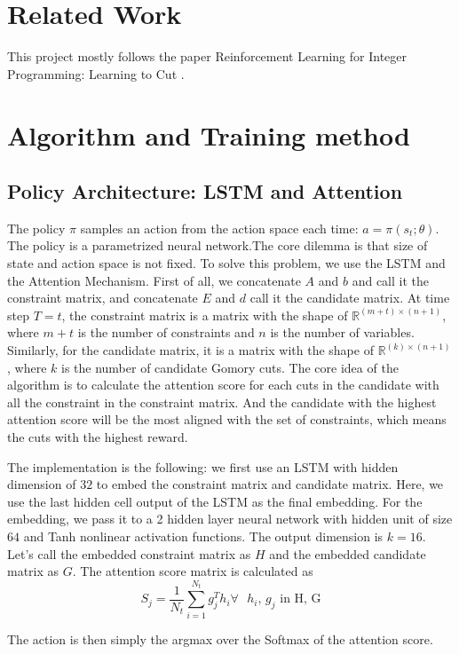 \documentclass{article}
\begin{document}
\section{Related Work}
This project mostly follows the paper Reinforcement Learning for Integer Programming: Learning to Cut \cite{rlcut}.

\section{Algorithm and Training method}
\subsection{Policy Architecture: LSTM and Attention}

The policy $\pi$ samples an action from the action space each time: $a = \pi(s_t ; \theta)$. The policy is a parametrized neural network.The core dilemma is that size of state and action space is not fixed. To solve this problem, we use the LSTM\cite{lstm} and the Attention Mechanism\cite{attention1}\cite{attention2}. First of all, we concatenate $A$ and $b$ and call it the constraint matrix, and concatenate $E$ and $d$ call it the candidate matrix. At time step $T = t$, the constraint matrix is a matrix with the shape of $\mathbb{R} ^ {(m+t) \times (n+1)}$, where $m+t$ is the number of constraints and $n$ is the number of variables. Similarly, for the candidate matrix, it is a matrix with the shape of $\mathbb{R} ^ {(k) \times (n+1)}$, where $k$ is the number of candidate Gomory cuts. The core idea of the algorithm is to calculate the attention score for each cuts in the candidate with all the constraint in the constraint matrix.\cite{rlcut} And the candidate with the highest attention score will be the most aligned with the set of constraints, which means the cuts with the highest reward. 

The implementation is the following: we first use an LSTM with hidden dimension of $32$ to embed the constraint matrix and candidate matrix. Here, we use the last hidden cell output of the LSTM as the final embedding. For the embedding, we pass it to a 2 hidden layer neural network with hidden unit of size $64$ and Tanh nonlinear activation functions. The output dimension is $k = 16$. Let's call the embedded constraint matrix as $H$ and the embedded candidate matrix as $G$. The attention score matrix is calculated as
 \[S_j = \frac{1}{N_t}\sum_{i=1}^{N_t} g_j^Th_i \text{$\forall$ $h_i$, $g_j$ in H, G} \]
 
 The action is then simply the argmax over the Softmax of the attention score.
\end{document}
